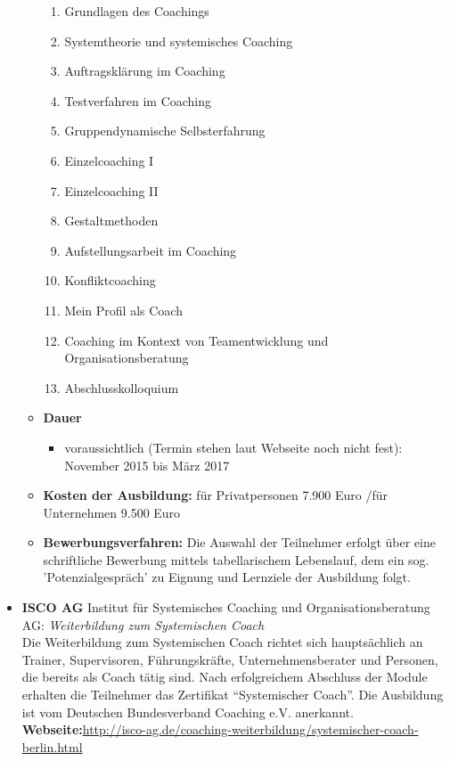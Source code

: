 \documentclass[11pt,a4paper]{article}
\begin{document}
\begin{itemize}
\begin{itemize}
		\begin{enumerate}
		\item Grundlagen des Coachings
		\item Systemtheorie und systemisches Coaching
		\item Auftragsklärung im Coaching
		\item Testverfahren im Coaching
		\item Gruppendynamische Selbsterfahrung
		\item Einzelcoaching I
		\item Einzelcoaching II
		\item Gestaltmethoden
		\item Aufstellungsarbeit im Coaching
		\item Konfliktcoaching
		\item Mein Profil als Coach
		\item Coaching im Kontext von Teamentwicklung und Organisationsberatung
		\item Abschlusskolloquium
		\end{enumerate}
	
	\item \textbf{Dauer}

		\begin{itemize} 
		\item voraussichtlich (Termin stehen laut Webseite noch nicht fest): November 2015 bis März 2017
		\end{itemize}

	\item \textbf{Kosten der Ausbildung:} für Privatpersonen 7.900 Euro /für Unternehmen 9.500 Euro

	\item \textbf{Bewerbungsverfahren:} Die Auswahl der Teilnehmer erfolgt über eine schriftliche Bewerbung mittels tabellarischem Lebenslauf, dem ein sog. 'Potenzialgespräch' zu Eignung und Lernziele der Ausbildung folgt.
	\end{itemize}

\item \textbf{ISCO AG} Institut für Systemisches Coaching und Organisationsberatung AG: \textsl{Weiterbildung zum Systemischen Coach}\\
Die Weiterbildung zum Systemischen Coach richtet sich hauptsächlich an Trainer, Supervisoren, Führungskräfte, Unternehmensberater und Personen, die bereits als Coach tätig sind. Nach erfolgreichem Abschluss der Module erhalten die Teilnehmer das Zertifikat "`Systemischer Coach"'. Die Ausbildung ist vom Deutschen Bundesverband Coaching e.V. anerkannt.
\textbf{Webseite:}\textsf{\textcolor{MidnightBlue}{\url{http://isco-ag.de/coaching-weiterbildung/systemischer-coach-berlin.html}}}


\end{itemize}
\end{document}
